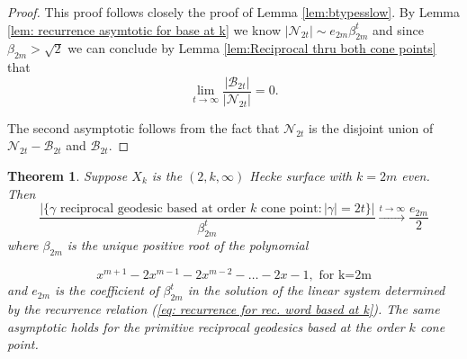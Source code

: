 \documentclass[11pt]{amsart}
\numberwithin{equation}{section}
\theoremstyle{plain}
\newtheorem{thm}{Theorem}[section]
\begin{document}
\begin{proof} This proof follows closely the proof of Lemma
\ref{lem:btypesslow}.
By Lemma \ref{lem: recurrence asymtotic for base at k} we know  $|\mathcal{N}_{2t}| \sim e_{2m} \beta_{2m} ^{t}$ and since  $\beta_{2m} >\sqrt{2}$  we can conclude by  Lemma \ref{lem:Reciprocal thru both cone points} that 
\[\displaystyle\lim_{t\to\infty}\dfrac{|\mathcal{B}_{2t}|}{|\mathcal{N}_{2t}|}=0.\]

The second asymptotic follows 
from  the fact that  $\mathcal{N}_{2t}$ is the disjoint union of 
 $\mathcal{N}_{2t}-\mathcal{B}_{2t}$   and $\mathcal{B}_{2t}$.\end{proof}







\begin{thm}\label{thm: k even based at order k}
Suppose   
$X_{k}$ is the $(2,k,\infty)$ Hecke surface with $k=2m$  even. Then
\begin{equation}
\frac{\big|\{\gamma \text{ reciprocal geodesic based at order 
$k$ cone point}: |\gamma|=2t\}\big|}
{\beta_{2m}^{t}} \xrightarrow{t\to\infty} \frac{e_{2m}}{2}
\end{equation}
where $\beta_{2m}$ is the unique positive root of the polynomial

\begin{equation}\label{eq: poly based at k}
  x^{m+1} -2x^{m-1} -2x^{m-2}- \dots -2x-1 , \text{ for k=2m}   
\end{equation}
and $e_{2m}$ is the coefficient of $\beta_{2m}^{t}$ in the solution of the linear system determined by  the recurrence relation (\ref{eq: recurrence for rec. word based at k}). The same asymptotic holds for the primitive reciprocal geodesics based at the order $k$ cone point. 

\end{thm}
\end{document}
